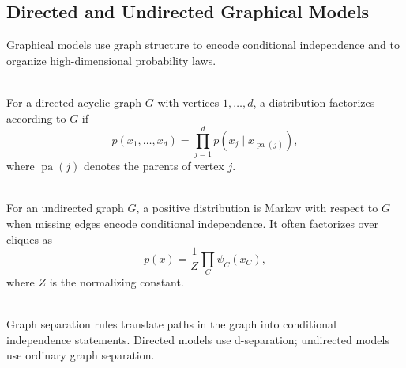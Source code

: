 \subsection{Directed and Undirected Graphical Models}

Graphical models use graph structure to encode conditional independence and to organize high-dimensional probability laws.

\begin{definition} \label{def:sl-directed-graphical-model} \\
For a directed acyclic graph $G$ with vertices $1,\ldots,d$, a distribution factorizes according to $G$ if
\[
p(x_1,\ldots,x_d)=\prod_{j=1}^d p(x_j\mid x_{\operatorname{pa}(j)}),
\]
where $\operatorname{pa}(j)$ denotes the parents of vertex $j$.
\end{definition}

\begin{definition} \label{def:sl-markov-random-field} \\
For an undirected graph $G$, a positive distribution is Markov with respect to $G$ when missing edges encode conditional independence.  It often factorizes over cliques as
\[
p(x)=\frac1Z\prod_{C}\psi_C(x_C),
\]
where $Z$ is the normalizing constant.
\end{definition}

\begin{remark} \label{rem:sl-separation-graphical-models} \\
Graph separation rules translate paths in the graph into conditional independence statements.  Directed models use d-separation; undirected models use ordinary graph separation.
\end{remark}
